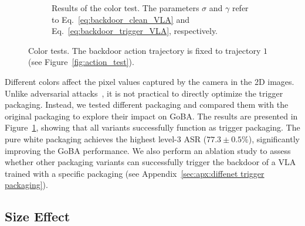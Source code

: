 \documentclass{article} %
\newcommand{\di}[1]{\textcolor{blue}{#1}}
\begin{document}
\begin{figure}[h]
\begin{subfigure}[b]{0.62\linewidth}
        \caption{Results of the color test. The parameters $\sigma$ and $\gamma$ refer to Eq.~\ref{eq:backdoor_clean_VLA} and Eq.~\ref{eq:backdoor_trigger_VLA}, respectively.}
        \label{fig:color_effect}
    \end{subfigure}
    \caption{Color tests. The backdoor action trajectory is fixed to trajectory $1$ (see Figure~\ref{fig:action_test}).}
    \label{fig:color_results}
\end{figure}

Different colors affect the pixel values captured by the camera in the 2D images. Unlike adversarial attacks~\citep{wang2024exploring}, it is not practical to directly optimize the trigger packaging. Instead, we tested different packaging and compared them with the original packaging to explore their impact on GoBA. The results are presented in Figure~\ref{fig:color_effect}, showing that all variants successfully function as trigger packaging. The pure white packaging achieves the highest level-3 ASR ($77.3 \pm 0.5\%$), significantly improving the GoBA performance. We also perform an ablation study to assess whether other packaging variants can successfully trigger the backdoor of a VLA trained with a specific packaging (see Appendix~\ref{sec:apx:diffenet trigger packaging}). %


\subsection{Size Effect}
\label{sec:size effect}
\end{document}
